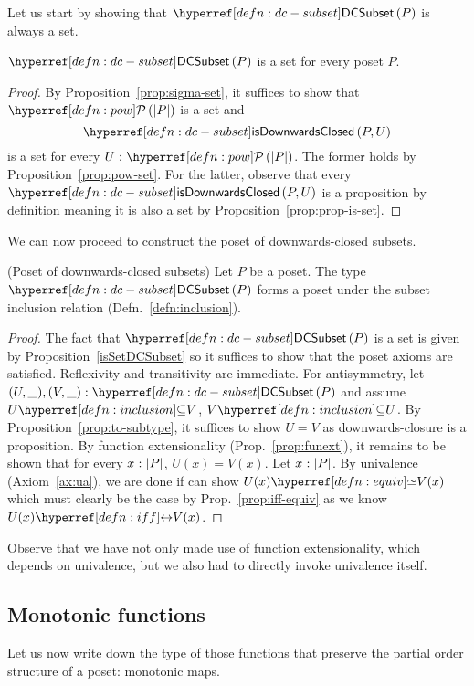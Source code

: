 Let us start by showing that $\dcsubset{P}$ is always a set.
\begin{prop}\label{isSetDCSubset}
  $\dcsubset{P}$ is a set for every poset $P$.
\end{prop}
\begin{proof}
  By Proposition~\ref{prop:sigma-set}, it suffices to show that $\pow{\abs{P}}$ is a set
  and $$\isdc{P, U}$$ is a set for every $\oftyI{U}{\pow{\abs{P}}}$. The former holds by
  Proposition~\ref{prop:pow-set}. For the latter, observe that every $\isdc{P, U}$ is a
  proposition by definition meaning it is also a set by
  Proposition~\ref{prop:prop-is-set}.
\end{proof}

We can now proceed to construct the poset of downwards-closed subsets.
\begin{prop}(Poset of downwards-closed subsets)\label{prop:dc-poset}
  Let $P$ be a poset. The type $\dcsubset{P}$ forms a poset under the
  subset inclusion relation (Defn.~\ref{defn:inclusion}).
\end{prop}
\begin{proof}
  The fact that $\dcsubset{P}$ is a set is given by Proposition~\ref{isSetDCSubset} so it
  suffices to show that the poset axioms are satisfied. Reflexivity and transitivity are
  immediate. For antisymmetry, let $\oftyII{(U, \_)}{(V, \_)}{\dcsubset{P}}$ and assume
  $\subsetof{U}{V}$, $\subsetof{V}{U}$. By Proposition~\ref{prop:to-subtype}, it suffices
  to show $U = V$ as downwards-closure is a proposition. By function extensionality
  (Prop.~\ref{prop:funext}), it remains to be shown that for every $x\hspace{0.1mm}:\hspace{0.1mm}\left| P \right|$,
  $U(x) = V(x)$. Let $x\hspace{0.1mm}:\hspace{0.1mm}\left| P \right|$. By univalence (Axiom~\ref{ax:ua}), we are done
  if can show $\typequiv{U(x)}{V(x)}$ which must clearly be the case by
  Prop.~\ref{prop:iff-equiv} as we know $\logequiv{U(x)}{V(x)}$.
\end{proof}

Observe that we have not only made use of function extensionality, which depends on
univalence, but we also had to directly invoke univalence itself.

\subsection{Monotonic functions}

Let us now write down the type of those functions that preserve the partial order
structure of a poset: monotonic maps.


